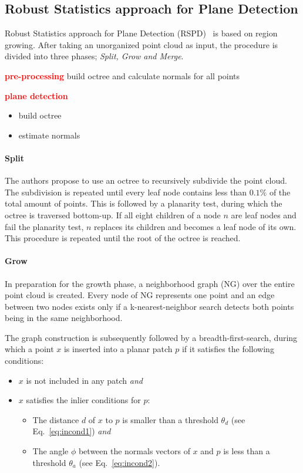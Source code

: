 \documentclass[main.tex]{subfiles}
\begin{document}
\subsection{Robust Statistics approach for Plane Detection}
\label{subsec:bg-rspd}
Robust Statistics approach for Plane Detection (RSPD)~\cite{Araújo_Oliveira_2020} is based on region growing. After taking an unorganized point cloud as input, the procedure is divided into three phases;
\textit{Split, Grow and Merge}.

\textbf{\textcolor{red}{pre-processing}}
build octree and calculate normals for all points

\textbf{\textcolor{red}{plane detection}}
\begin{itemize}
    \item build octree
    \item estimate normals
\end{itemize}
\paragraph*{Split}
The authors propose to use an octree to recursively subdivide the point cloud. The subdivision is repeated until every leaf node contains less than $0.1\%$ of the total amount
of points.
This is followed by a planarity test, during which the octree is traversed bottom-up. If all eight children of a node $n$ are leaf nodes and fail the planarity test, $n$ replaces its children
and becomes a leaf node of its own. This procedure is repeated until the root of the octree is reached.

\paragraph*{Grow}
In preparation for the growth phase, a neighborhood graph (NG) over the entire point cloud is created. Every node of NG represents one point and an edge between two nodes exists only if
a k-nearest-neighbor search detects both points being in the same neighborhood.

The graph construction is subsequently followed by a breadth-first-search, during which a point $x$ is inserted into a planar patch $p$ if it satisfies the following conditions:
\begin{itemize}
    \item $x$ is not included in any patch \textit{and}
    \item $x$ satisfies the inlier conditions for $p$: %
          \begin{itemize}
              \item The distance $d$ of $x$ to $p$ is smaller than a threshold $\theta_d$ (see Eq.~\ref{eq:incond1}) \textit{and} %
              \item The angle $\phi$ between the normals vectors of $x$ and $p$ is less than a threshold $\theta_a$ (see Eq.~\ref{eq:incond2}). %
          \end{itemize}
\end{itemize}
\end{document}

